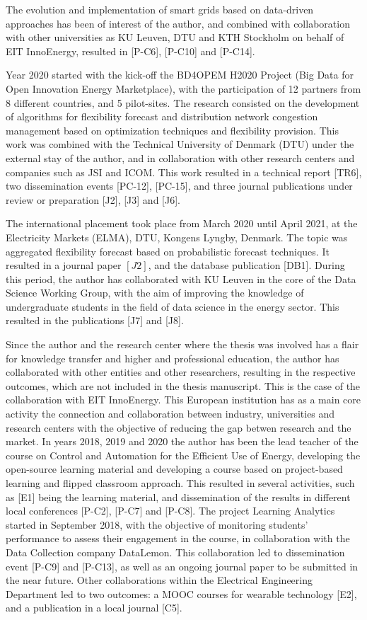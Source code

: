 The evolution and implementation of smart grids based on data-driven approaches has been of interest of the author, and combined with collaboration with other universities as KU Leuven, DTU and KTH Stockholm on behalf of EIT InnoEnergy, resulted in [P-C6], [P-C10] and [P-C14]. 

Year 2020 started with the kick-off the BD4OPEM H2020 Project (Big Data for Open Innovation Energy Marketplace), with the participation of 12 partners from 8 different countries, and 5 pilot-sites. The research consisted on the development of algorithms for flexibility forecast and distribution network congestion management based on optimization techniques and flexibility provision. This work was combined with the Technical University of Denmark (DTU) under the external stay of the author, and in collaboration with other research centers and companies such as JSI and ICOM. This work resulted in a technical report [TR6], two dissemination events [PC-12], [PC-15], and three journal publications under review or preparation [J2], [J3] and [J6].  

The international placement took place from March 2020 until April 2021, at the Electricity Markets (ELMA), DTU, Kongens Lyngby, Denmark. The topic was aggregated flexibility forecast based on probabilistic forecast techniques. It resulted in a journal paper $[J2]$, and the database publication [DB1]. During this period, the author has collaborated with KU Leuven in the core of the Data Science Working Group, with the aim of improving the knowledge of undergraduate students in the field of data science in the energy sector. This resulted in the publications [J7] and [J8]. 

Since the author and the research center where the thesis was involved has a flair for knowledge transfer and higher and professional education, the author has collaborated with other entities and other researchers, resulting in the respective outcomes, which are not included in the thesis manuscript. This is the case of the collaboration with EIT InnoEnergy. This European institution has as a main core activity the connection and collaboration between industry, universities and research centers with the objective of reducing the gap betwen research and the market. In years 2018, 2019 and 2020 the author has been the lead teacher of the course on Control and Automation for the Efficient Use of Energy, developing the open-source learning material and developing a course based on project-based learning and flipped classroom approach. This resulted in several activities, such as [E1] being the learning material, and dissemination of the results in different local conferences [P-C2], [P-C7] and [P-C8]. The project Learning Analytics started in September 2018, with the objective of monitoring students' performance to assess their engagement in the course, in collaboration with the Data Collection company DataLemon. This collaboration led to dissemination event [P-C9] and [P-C13], as well as an ongoing journal paper to be submitted in the near future. Other collaborations within the Electrical Engineering Department led to two outcomes: a MOOC courses for wearable technology [E2], and a publication in a local journal [C5]. 


